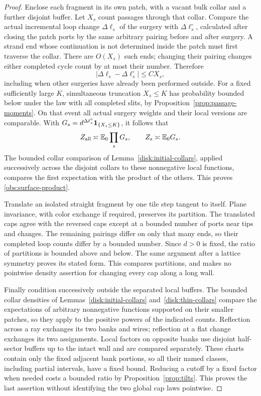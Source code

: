 \begin{proof}
Enclose each fragment in its own patch, with a vacant bulk collar
and a further disjoint buffer.  Let $X_s$ count passages through that
collar.  Compare the actual incremental loop change $\Delta\ell_s$
of the surgery with $\Delta\ell_s^\circ$, calculated after closing
the patch ports by the same arbitrary pairing before and after
surgery.  A strand end whose continuation is not determined inside
the patch must first traverse the collar.  There are $O(X_s)$ such
ends; changing their pairing changes either completed cycle count
by at most their number.  Therefore
\[
 |\Delta\ell_s-\Delta\ell_s^\circ|\le C X_s,
\]
including when other surgeries have already been performed outside.
For a fixed sufficiently large $K$, simultaneous truncation
$X_s\le K$ has probability bounded below under the law with all
completed slits, by Proposition~\ref{prop:passage-moments}.
On that event all actual surgery weights and their local versions
are comparable.  With
$G_s=d^{\Delta\ell_s^\circ}\mathbf 1_{\{X_s\le K\}}$, it follows that
\[
 Z_{\rm all}\asymp\mathbb E_0\prod_sG_s,
 \qquad Z_s\asymp\mathbb E_0G_s.
\]
The bounded collar comparison of Lemma~\ref{disk:initial-collars},
applied successively across the disjoint collars to these nonnegative
local functions, compares the first expectation with the product
of the others.  This proves \eqref{obs:surface-product}.

Translate an isolated straight fragment by one tile step tangent
to itself.  Plane invariance, with color exchange if required,
preserves its partition.  The translated caps agree with the
reversed caps except at a bounded number of ports near tips and
changes.  The remaining pairings differ on only that many ends,
so their completed loop counts differ by a bounded number.  Since
$d>0$ is fixed, the ratio of partitions is bounded above and below.
The same argument after a lattice symmetry proves its stated form.
This compares partitions, and makes no pointwise density assertion
for changing every cap along a long wall.

Finally condition successively outside the separated local buffers.
The bounded collar densities of Lemmas~\ref{disk:initial-collars}
and~\ref{disk:thin-collars} compare the expectations of arbitrary
nonnegative functions supported on their smaller patches, so they
apply to the positive powers of the indicated counts.  Reflection
across a ray exchanges its two banks and wires; reflection at a flat
change exchanges its two assignments.  Local factors on opposite
banks use disjoint half-sector buffers up to the intact wall and
are compared separately.  These charts contain only the fixed
adjacent bank portions, so all their named classes, including
partial intervals, have a fixed bound.  Reducing a cutoff by a fixed
factor when needed costs a bounded ratio by Proposition~\ref{prop:tilts}.
This proves the last assertion without identifying the two global
cap laws pointwise.
\end{proof}

